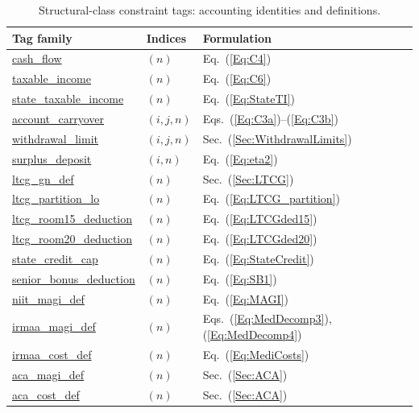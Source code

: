 \documentclass[fleqn,12pt]{report}
\newcommand{\code}[1]{\url{#1}}
\begin{document}
\begin{table}[hbt!]
\centering\small
\begin{tabular}{lll}
\hline
Tag family & Indices & Formulation \\
\hline
\code{cash_flow} & $(n)$ & Eq.~(\ref{Eq:C4}) \\
\code{taxable_income} & $(n)$ & Eq.~(\ref{Eq:C6}) \\
\code{state_taxable_income} & $(n)$ & Eq.~(\ref{Eq:StateTI}) \\
\code{account_carryover} & $(i,j,n)$ & Eqs.~(\ref{Eq:C3a})--(\ref{Eq:C3b}) \\
\code{withdrawal_limit} & $(i,j,n)$ & Sec.~(\ref{Sec:WithdrawalLimits}) \\
\code{surplus_deposit} & $(i,n)$ & Eq.~(\ref{Eq:eta2}) \\
\code{ltcg_gn_def} & $(n)$ & Sec.~(\ref{Sec:LTCG}) \\
\code{ltcg_partition_lo} & $(n)$ & Eq.~(\ref{Eq:LTCG_partition}) \\
\code{ltcg_room15_deduction} & $(n)$ & Eq.~(\ref{Eq:LTCGded15}) \\
\code{ltcg_room20_deduction} & $(n)$ & Eq.~(\ref{Eq:LTCGded20}) \\
\code{state_credit_cap} & $(n)$ & Eq.~(\ref{Eq:StateCredit}) \\
\code{senior_bonus_deduction} & $(n)$ & Eq.~(\ref{Eq:SB1}) \\
\code{niit_magi_def} & $(n)$ & Eq.~(\ref{Eq:MAGI}) \\
\code{irmaa_magi_def} & $(n)$ & Eqs.~(\ref{Eq:MedDecomp3}), (\ref{Eq:MedDecomp4}) \\
\code{irmaa_cost_def} & $(n)$ & Eq.~(\ref{Eq:MediCosts}) \\
\code{aca_magi_def} & $(n)$ & Sec.~(\ref{Sec:ACA}) \\
\code{aca_cost_def} & $(n)$ & Sec.~(\ref{Sec:ACA}) \\
\hline
\end{tabular}
\caption{Structural-class constraint tags: accounting identities and definitions.}
\label{Tab:TagsStructural}
\end{table}
\end{document}
